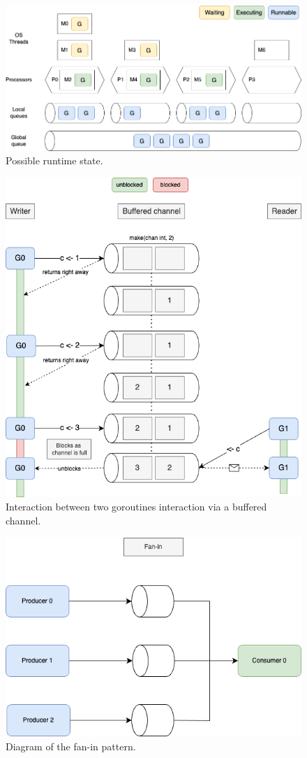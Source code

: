 \documentclass[
  digital,
  color,
  oneside,
  nosansbold,
  nocolorbold,
  lof,
  nolot,
]{fithesis4}
\begin{document}
\begin{figure}[H]
    \centering
    \includegraphics[width=12cm]{figures/scheduling.png}
    \caption{Possible runtime state.}
\end{figure}

\begin{figure}[H]
    \centering
    \includegraphics[width=12cm]{figures/buffered-full.png}
    \caption{Interaction between two goroutines interaction via a buffered channel.}
\end{figure}

\begin{figure}[H]
    \centering
    \includegraphics[width=12cm]{figures/fanin.png}
    \caption{Diagram of the fan-in pattern.}
\end{figure}
\end{document}
